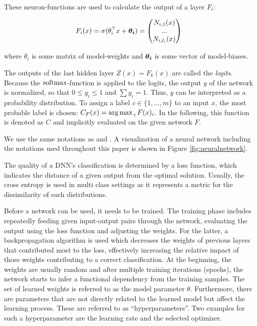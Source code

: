 These neuron-functions are used to calculate the output of a layer $F_i$:

\begin{equation*}
F_i(x) = \sigma(\theta_i^\top x + \boldsymbol{\theta_i}) = \begin{pmatrix}
N_{i,1}(x)\\...\\N_{i,l_i}(x)
\end{pmatrix}
\end{equation*}

where $\theta_i$ is some matrix of model-weights and $\boldsymbol{\theta_i}$ is some vector of model-biases.

The outputs of the last hidden layer $Z(x) = F_k(x)$ are called the \emph{logits}. Because the $\operatorname{softmax}$-function is applied to the logits, the output $y$ of the network is normalized, so that $0 \leq y_i \leq 1$ and $\sum y_i = 1$. Thus, $y$ can be interpreted as a probability distribution. To assign a label $c \in \{1,...,m\}$ to an input $x$, the most probable label is chosen: $C_F(x) = \operatorname*{arg\,max\,}_i F(x)_i$. In the following, this function is denoted as $C$ and implicitly evaluated on the given network $F$.

We use the same notations as \citet{carlini2017towards} and \citet{papernot2016distillation}. A visualization of a neural network including the notations used throughout this paper is shown in Figure \ref{fig:neuralnetwork}.

The quality of a DNN's classification is determined by a loss function, which indicates the distance of a given output from the optimal solution.
Usually, the cross entropy is used in multi class settings as it represents a metric for the dissimilarity of such distributions.

Before a network can be used, it needs to be trained.
The training phase includes repeatedly feeding given input-output pairs through the network, evaluating the output using the loss function and adjusting the weights.
For the latter, a backpropagation algorithm is used which decreases the weights of previous layers that contributed most to the loss, effectively increasing the relative impact of those weights contributing to a correct classification.
At the beginning, the weights are usually random and after multiple training iterations (epochs), the network starts to infer a functional dependency from the training samples.
The set of learned weights is referred to as the model parameter $\theta$.
Furthermore, there are parameters that are not directly related to the learned model but affect the learning process.
These are referred to as \enquote{hyperparameters}.
Two examples for such a hyperparameter are the learning rate and the selected optimizer.

